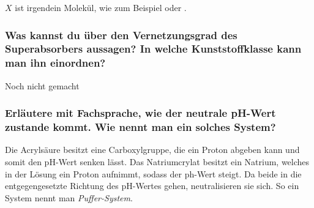\documentclass[../../main.tex]{subfiles}
\begin{document}
\begin{center}
    $X$ ist irgendein Molekül, wie zum Beispiel  oder .
\end{center}
\subsubsection{Was kannst du über den Vernetzungsgrad des Superabsorbers aussagen? In welche Kunststoffklasse kann man ihn einordnen?}
Noch nicht gemacht
\subsubsection{Erläutere mit Fachsprache, wie der neutrale pH-Wert zustande kommt. Wie nennt man ein solches System?}
Die Acrylsäure besitzt eine Carboxylgruppe, die ein Proton abgeben kann und
somit den pH-Wert senken lässt. Das Natriumcrylat besitzt ein Natrium, welches
in der Lösung ein Proton aufnimmt, sodass der ph-Wert steigt. Da beide in die
entgegengesetzte Richtung des pH-Wertes gehen, neutralisieren sie sich. So ein
System nennt man \textit{Puffer-System}.
%
%
\end{document}
